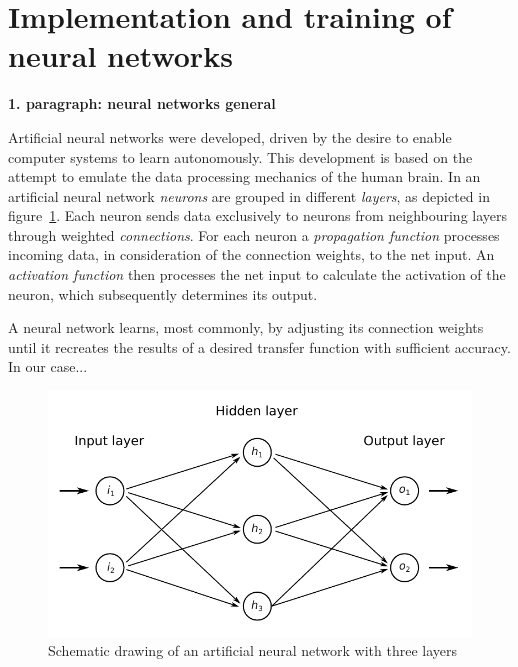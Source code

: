 \documentclass[12pt]{scrartcl}
\begin{document}

\section*{Implementation and training of neural networks}

\textbf{1. paragraph: neural networks general}


Artificial neural networks were developed, driven by the desire to enable computer systems to learn autonomously.
This development is based on the attempt to emulate the data processing mechanics of the human brain. %
In an artificial neural network \emph{neurons} are grouped in different \emph{layers}, as depicted in figure~\ref{fig:neuralnetwork}. 
Each neuron sends data exclusively to neurons from neighbouring layers through weighted \emph{connections}.
For each neuron a \emph{propagation function} processes incoming data, in consideration of the connection weights, to the net input.
An \emph{activation function} then processes the net input to calculate the activation of the neuron, which subsequently determines its output. \cite{KrieselNN}

A neural network learns, most commonly, by adjusting its connection weights until it recreates the results of a desired transfer function with sufficient accuracy.
In our case...

\begin{figure}[h]
    \centering
    \includegraphics{figures/neuralnetworks.pdf}
    \caption{Schematic drawing of an artificial neural network with three layers}
    \label{fig:neuralnetwork}
\end{figure}
\end{document}
